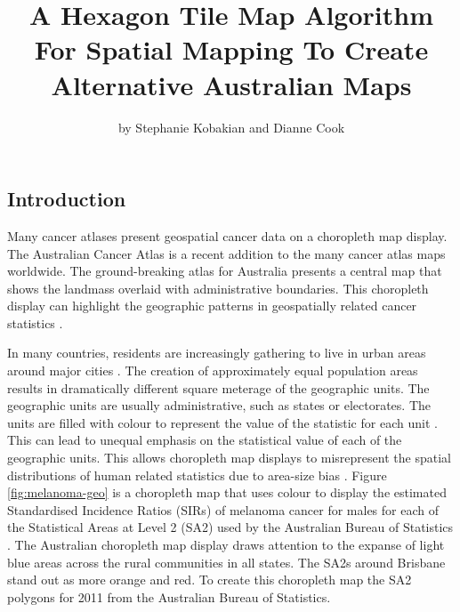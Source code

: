 \title{A Hexagon Tile Map Algorithm For Spatial Mapping To Create Alternative
Australian Maps}
\author{by Stephanie Kobakian and Dianne Cook}

\maketitle


\hypertarget{introduction}{%
\subsection{Introduction}\label{introduction}}

Many cancer atlases present geospatial cancer data on a choropleth map
display. The Australian Cancer Atlas \citep{TACA} is a recent addition
to the many cancer atlas maps worldwide. The ground-breaking atlas for
Australia presents a central map that shows the landmass overlaid with
administrative boundaries. This choropleth display can highlight the
geographic patterns in geospatially related cancer statistics
\citep{SAMGIS}.

In many countries, residents are increasingly gathering to live in urban
areas around major cities \citep{ACTUC}. The creation of approximately
equal population areas results in dramatically different square meterage
of the geographic units. The geographic units are usually
administrative, such as states or electorates. The units are filled with
colour to represent the value of the statistic for each unit \citep{EI}.
This can lead to unequal emphasis on the statistical value of each of
the geographic units. This allows choropleth map displays to
misrepresent the spatial distributions of human related statistics due
to area-size bias \citep{BCM}. Figure \ref{fig:melanoma-geo} is a
choropleth map that uses colour to display the estimated Standardised
Incidence Ratios (SIRs) of melanoma cancer for males for each of the
Statistical Areas at Level 2 (SA2) used by the Australian Bureau of
Statistics \citeyearpar{abs2011}. The Australian choropleth map display
draws attention to the expanse of light blue areas across the rural
communities in all states. The SA2s around Brisbane stand out as more
orange and red. To create this choropleth map the SA2 polygons for 2011
from the Australian Bureau of Statistics.

